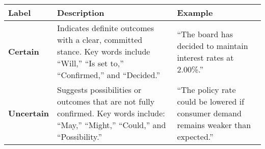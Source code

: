 \begin{table*}
    \caption{}
    \vspace{1em}
    \centering
    \begin{tabular}{p{} p{} p{}}
    \toprule
    \textbf{Label} & \textbf{Description} & \textbf{Example} \\
    \midrule
    \textbf{Certain} & 
    Indicates definite outcomes with a clear, committed stance. Key words include ``Will,'' ``Is set to,'' ``Confirmed,'' and ``Decided.'' 
    & “The board has decided to maintain interest rates at 2.00\%.” \\
    \midrule
    \textbf{Uncertain} & 
    Suggests possibilities or outcomes that are not fully confirmed. Key words include: ``May,'' ``Might,'' ``Could,'' and ``Possibility.'' 
    & “The policy rate could be lowered if consumer demand remains weaker than expected.” \\
    \bottomrule
    \end{tabular}
    \label{tb:rbi_certainty_guide}
    \end{table*}